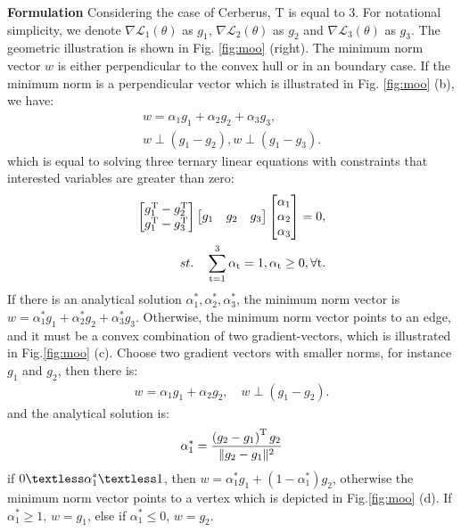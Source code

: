 \documentclass[10pt,twocolumn,letterpaper]{article}
\begin{document}
\textbf{Formulation} Considering the case of Cerberus, T is equal to 3. For notational simplicity, we denote $\nabla \mathcal{L}_{1} \left(\theta \right)$ as $g_1$, $\nabla \mathcal{L}_{2} \left(\theta \right)$ as $g_2$ and $\nabla \mathcal{L}_{3} \left(\theta \right)$ as $g_3$. The geometric illustration is shown in Fig. \ref{fig:moo} (right). The  minimum norm vector $w$ is either perpendicular to the convex hull or in an boundary case. If the minimum norm is a perpendicular vector which is illustrated in Fig. \ref{fig:moo} (b), we have:
\begin{align}
w = \alpha_1 g_1 + \alpha_2 g_2 + \alpha_3 g_3,\\
w \perp \left( g_1  - g_2 \right), w \perp \left( g_1  - g_3 \right).
\end{align}
which is equal to solving three ternary linear equations with constraints that interested variables are greater than zero:
\begin{align}
\begin{bmatrix} 
 g_1^{\rm T}  - g_2^{\rm T} \\
 g_1^{\rm T}  - g_3^{\rm T} \\
\end{bmatrix} \begin{bmatrix}
g_1 & g_2 & g_3\\
\end{bmatrix} 
\begin{bmatrix}
\alpha_1 \\ \alpha_2 \\ \alpha_3\\
\end{bmatrix} = 0,\\
st. \rm \quad \sum_{t=1}^{3} \alpha_t = 1,\alpha_t \geq 0,\forall t. 
\end{align}
If there is an analytical solution $\alpha_1^*,\alpha_2^*,\alpha_3^*$, the minimum norm vector is $w = \alpha_1^* g_1 + \alpha_2^* g_2 + \alpha_3^* g_3$. Otherwise, the minimum norm vector points to an edge, and it must be a convex combination of two gradient-vectors, which is illustrated in Fig.\ref{fig:moo} (c). Choose two gradient vectors with smaller norms, for instance $g_1$ and $g_2$, then there is:
\begin{align}
w = \alpha_1 g_1 + \alpha_2 g_2, \quad w \perp \left( g_1  - g_2 \right).
\end{align}
and the analytical solution is:
\begin{align}
\alpha_1^* = \frac{\left(g_2-g_1\right)^{\rm T}g_2}{\|g_2-g_1\|^2}
\end{align}
if $0\textless \alpha_1^*\textless 1$, then $w = \alpha_1^* g_1 + (1-\alpha_1^*) g_2$, otherwise the minimum norm vector points to a vertex which is depicted in Fig.\ref{fig:moo} (d). If $\alpha_1^*\geq1$, $w = g_1$, else if $\alpha_1^*\leq0$, $w = g_2$.
\end{document}

